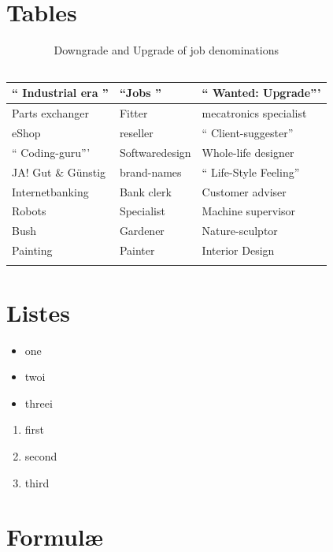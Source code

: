 \section{Tables}

\begin{table}[H]
\small
\centering
\begin{tabular}{p{5cm}|l|p{3cm}}
`` Industrial era '' &  ``Jobs '' & `` Wanted: Upgrade''' \\ \hline
Parts exchanger & Fitter & mecatronics specialist \\
eShop & reseller & `` Client-suggester'' \\
`` Coding-guru''' & Softwaredesign & Whole-life designer \\
JA! Gut \& Günstig & brand-names & `` Life-Style Feeling'' \\
Internetbanking & Bank clerk & Customer adviser \\
Robots & Specialist & Machine supervisor \\
Bush & Gardener & Nature-sculptor \\
Painting & Painter & Interior Design \\
 &  & \\
\end{tabular}
\caption[Downgrade and upgrade of job denominations]{Downgrade and Upgrade of job denominations \\ \ \ \ \textcite{DueckKo:2016}}
\label{tab:Downgrade and Upgrade of job denominations}
\end{table} 

\section{Listes}

\begin{itemize}
 \itemsep0pt
 \item one
 \item twoi
 \item threei
\end{itemize}

\begin{enumerate}
 \itemsep0pt
 \item first
 \item second
 \item third
\end{enumerate}


\section{Formulæ}

